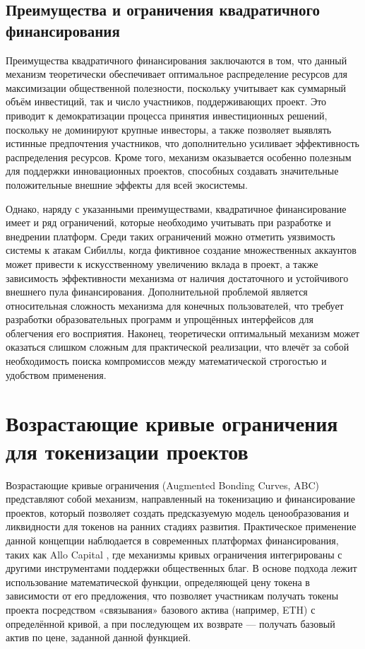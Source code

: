 \documentclass[
    candidate, %
    subf, %
    dotsinheaders=false,
]{disser}
\begin{document}
  \subsection{Преимущества и ограничения квадратичного финансирования}

  Преимущества квадратичного финансирования заключаются в том, что данный механизм теоретически обеспечивает оптимальное распределение ресурсов для максимизации общественной полезности, поскольку учитывает как суммарный объём инвестиций, так и число участников, поддерживающих проект. Это приводит к демократизации процесса принятия инвестиционных решений, поскольку не доминируют крупные инвесторы, а также позволяет выявлять истинные предпочтения участников, что дополнительно усиливает эффективность распределения ресурсов. Кроме того, механизм оказывается особенно полезным для поддержки инновационных проектов, способных создавать значительные положительные внешние эффекты для всей экосистемы.

  Однако, наряду с указанными преимуществами, квадратичное финансирование имеет и ряд ограничений, которые необходимо учитывать при разработке и внедрении платформ. Среди таких ограничений можно отметить уязвимость системы к атакам Сибиллы, когда фиктивное создание множественных аккаунтов может привести к искусственному увеличению вклада в проект, а также зависимость эффективности механизма от наличия достаточного и устойчивого внешнего пула финансирования. Дополнительной проблемой является относительная сложность механизма для конечных пользователей, что требует разработки образовательных программ и упрощённых интерфейсов для облегчения его восприятия. Наконец, теоретически оптимальный механизм может оказаться слишком сложным для практической реализации, что влечёт за собой необходимость поиска компромиссов между математической строгостью и удобством применения.

  \section{Возрастающие кривые ограничения для токенизации проектов}

  Возрастающие кривые ограничения (Augmented Bonding Curves, ABC) представляют собой механизм, направленный на токенизацию и финансирование проектов, который позволяет создать предсказуемую модель ценообразования и ликвидности для токенов на ранних стадиях развития. Практическое применение данной концепции наблюдается в современных платформах финансирования, таких как Allo Capital \cite{allo_capital}, где механизмы кривых ограничения интегрированы с другими инструментами поддержки общественных благ. В основе подхода лежит использование математической функции, определяющей цену токена в зависимости от его предложения, что позволяет участникам получать токены проекта посредством «связывания» базового актива (например, ETH) с определённой кривой, а при последующем их возврате — получать базовый актив по цене, заданной данной функцией.
\end{document}
